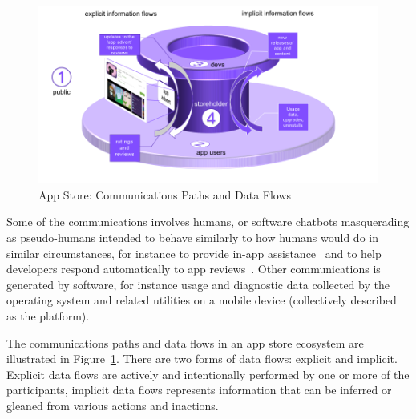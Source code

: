 \begin{figure}[ht]
    \centering
    \includegraphics[width=17cm]{images/app-store-data-flows-3d.png}
    \caption{App Store: Communications Paths and Data Flows}
    \label{fig:app-store-data-flows}
\end{figure}

Some of the communications involves humans, or software chatbots masquerading as pseudo-humans intended to behave similarly to how humans would do in similar circumstances, for instance to provide in-app assistance~\citep{baez2020_chatbot_integrations} and to help developers respond automatically to app reviews~\citep{greenheld2018_automating_developers_responses_to_app_reviews}. Other communications is generated by software, for instance usage and diagnostic data collected by the operating system and related utilities on a mobile device (collectively described as the platform).


The communications paths and data flows in an app store ecosystem are illustrated in Figure~\ref{fig:app-store-data-flows}. There are two forms of data flows: explicit and implicit. Explicit data flows are actively and intentionally performed by one or more of the participants, implicit data flows represents information that can be inferred or gleaned from various actions and inactions.

